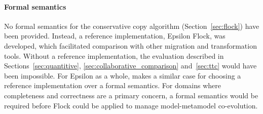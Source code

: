 \paragraph{Formal semantics} No formal semantics for the conservative copy algorithm (Section~\ref{sec:flock}) have been provided. Instead, a reference implementation, Epsilon Flock, was developed, which facilitated comparison with other migration and transformation tools. Without a reference implementation, the evaluation described in Sections~\ref{sec:quantitive}, \ref{sec:collaborative_comparison} and~\ref{sec:ttc} would have been impossible. For Epsilon as a whole, \cite{kolovos09thesis} makes a similar case for choosing a reference implementation over a formal semantics. For domains where completeness and correctness are a primary concern, a formal semantics would be required before Flock could be applied to manage model-metamodel co-evolution.  